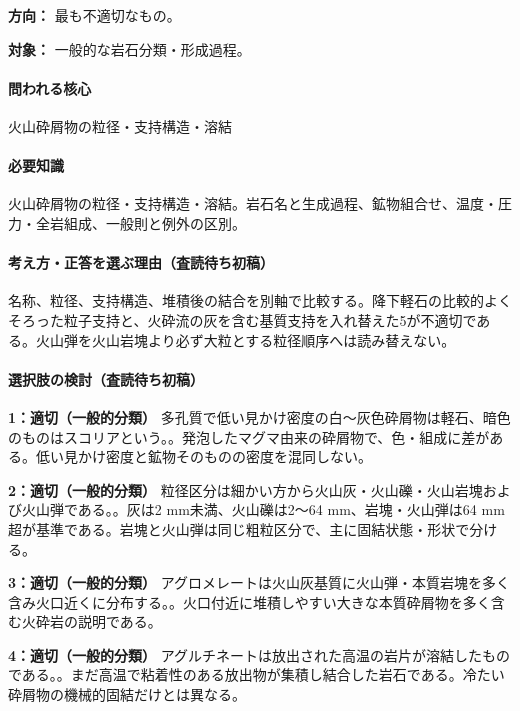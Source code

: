 \noindent\textbf{方向：} 最も不適切なもの。\par

\noindent\textbf{対象：} 一般的な岩石分類・形成過程。\par

\paragraph{問われる核心} 火山砕屑物の粒径・支持構造・溶結

\paragraph{必要知識} 火山砕屑物の粒径・支持構造・溶結。岩石名と生成過程、鉱物組合せ、温度・圧力・全岩組成、一般則と例外の区別。

\paragraph{考え方・正答を選ぶ理由（査読待ち初稿）} 名称、粒径、支持構造、堆積後の結合を別軸で比較する。降下軽石の比較的よくそろった粒子支持と、火砕流の灰を含む基質支持を入れ替えた5が不適切である。火山弾を火山岩塊より必ず大粒とする粒径順序へは読み替えない。

\paragraph{選択肢の検討（査読待ち初稿）}\mbox{}\par

\noindent\textbf{1：適切（一般的分類）} 多孔質で低い見かけ密度の白〜灰色砕屑物は軽石、暗色のものはスコリアという。。発泡したマグマ由来の砕屑物で、色・組成に差がある。低い見かけ密度と鉱物そのものの密度を混同しない。\par

\noindent\textbf{2：適切（一般的分類）} 粒径区分は細かい方から火山灰・火山礫・火山岩塊および火山弾である。。灰は2 mm未満、火山礫は2〜64 mm、岩塊・火山弾は64 mm超が基準である。岩塊と火山弾は同じ粗粒区分で、主に固結状態・形状で分ける。\par

\noindent\textbf{3：適切（一般的分類）} アグロメレートは火山灰基質に火山弾・本質岩塊を多く含み火口近くに分布する。。火口付近に堆積しやすい大きな本質砕屑物を多く含む火砕岩の説明である。\par

\noindent\textbf{4：適切（一般的分類）} アグルチネートは放出された高温の岩片が溶結したものである。。まだ高温で粘着性のある放出物が集積し結合した岩石である。冷たい砕屑物の機械的固結だけとは異なる。\par

